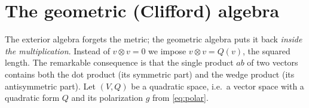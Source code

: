\section{The geometric (Clifford) algebra}\label{sec:clifford}

The exterior algebra forgets the metric; the geometric algebra puts it back \emph{inside the multiplication}. Instead of
$v\otimes v=0$ we impose $v\otimes v=Q(v)$, the squared length. The remarkable consequence is that the single product $ab$ of two
vectors contains both the dot product (its symmetric part) and the wedge product (its antisymmetric part).
Let $(V,Q)$ be a quadratic space, i.e.\ a vector space with a quadratic form $Q$ and its polarization $g$ from \eqref{eq:polar}.




